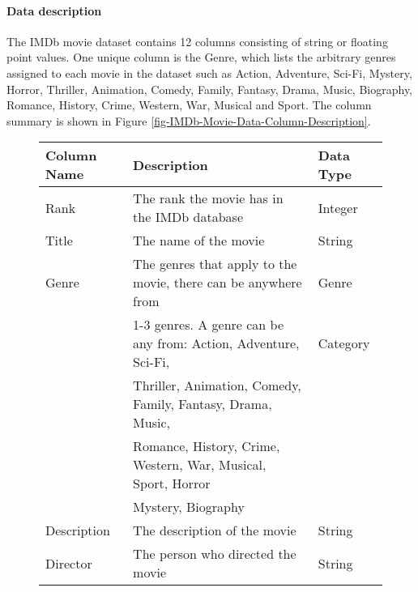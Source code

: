     \paragraph{Data description}
        The IMDb movie dataset contains 12 columns consisting of string or floating point values.
        One unique column is the Genre, which lists the arbitrary genres assigned to each movie in the dataset such as Action, Adventure, Sci-Fi, Mystery, Horror, Thriller, 
            Animation, Comedy, Family, Fantasy, Drama, Music, Biography, Romance, History, Crime, Western, War, Musical and Sport.
        The column summary is shown in Figure \ref*{fig-IMDb-Movie-Data-Column-Description}.
        \begin{figure}[h]
            \centering
            \begin{tabular}[width=\linewidth]{lll}
                \toprule
                Column Name &           Description                                                                 & Data Type \\
                \midrule
                Rank &                  The rank the movie has in the IMDb database                                 & Integer \\          
                Title &                 The name of the movie                                                       & String \\
                Genre &                 The genres that apply to the movie, there can be anywhere from              & Genre \\
                {}      &               1-3 genres. A genre can be any from: Action, Adventure, Sci-Fi,             & Category \\
                {}      &               Thriller, Animation, Comedy, Family, Fantasy, Drama, Music,                 & {} \\
                {}      &               Romance, History, Crime, Western, War, Musical, Sport, Horror               & {} \\
                {}      &               Mystery, Biography                                                          & {} \\
                Description &           The description of the movie                                                & String \\
                Director &              The person who directed the movie                                           & String \\

\end{tabular}
\end{figure}

